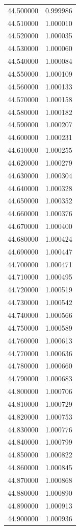 \begin{tabular}{rr}
44.500000 & 0.999986 \\
44.510000 & 1.000010 \\
44.520000 & 1.000035 \\
44.530000 & 1.000060 \\
44.540000 & 1.000084 \\
44.550000 & 1.000109 \\
44.560000 & 1.000133 \\
44.570000 & 1.000158 \\
44.580000 & 1.000182 \\
44.590000 & 1.000207 \\
44.600000 & 1.000231 \\
44.610000 & 1.000255 \\
44.620000 & 1.000279 \\
44.630000 & 1.000304 \\
44.640000 & 1.000328 \\
44.650000 & 1.000352 \\
44.660000 & 1.000376 \\
44.670000 & 1.000400 \\
44.680000 & 1.000424 \\
44.690000 & 1.000447 \\
44.700000 & 1.000471 \\
44.710000 & 1.000495 \\
44.720000 & 1.000519 \\
44.730000 & 1.000542 \\
44.740000 & 1.000566 \\
44.750000 & 1.000589 \\
44.760000 & 1.000613 \\
44.770000 & 1.000636 \\
44.780000 & 1.000660 \\
44.790000 & 1.000683 \\
44.800000 & 1.000706 \\
44.810000 & 1.000729 \\
44.820000 & 1.000753 \\
44.830000 & 1.000776 \\
44.840000 & 1.000799 \\
44.850000 & 1.000822 \\
44.860000 & 1.000845 \\
44.870000 & 1.000868 \\
44.880000 & 1.000890 \\
44.890000 & 1.000913 \\
44.900000 & 1.000936 \\

\end{tabular}
